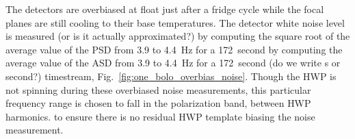 


The detectors are overbiased at float just after a fridge cycle while the focal planes are still cooling to their base temperatures. 
The detector white noise level is measured 
(or is it actually approximated?) 
by computing the square root of the average value of the \ac{PSD} from 3.9 to 4.4~Hz for a 172~second 
by computing the average value of the \ac{ASD} from 3.9 to 4.4~Hz for a 172~second 
(do we write s or second?) 
timestream, Fig.~\ref{fig:one_bolo_overbias_noise}. 
Though the \ac{HWP} is not spinning during these overbiased noise measurements, this particular frequency range is chosen to fall in the polarization band, between \ac{HWP} harmonics. 
to ensure there is no residual \ac{HWP} template biasing the noise measurement. 

